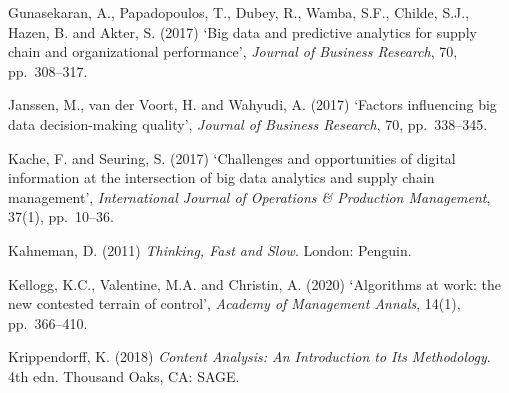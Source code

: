 \documentclass[11pt,a4paper]{article}
\numberwithin{figure}{section}
\numberwithin{table}{section}
\begin{document}
{\noindent\hypertarget{ref31}{}\begin{minipage}[t]{\dimexpr\linewidth-1.05cm\relax}Gunasekaran, A., Papadopoulos, T., Dubey, R., Wamba, S.F., Childe, S.J., Hazen, B. and Akter, S. (2017) `Big data and predictive analytics for supply chain and organizational performance', \emph{Journal of Business Research}, 70, pp.~308--317.\end{minipage}\par\vspace{4pt}
\noindent\hypertarget{ref32}{}\begin{minipage}[t]{\dimexpr\linewidth-1.05cm\relax}Janssen, M., van der Voort, H. and Wahyudi, A. (2017) `Factors influencing big data decision-making quality', \emph{Journal of Business Research}, 70, pp.~338--345.\end{minipage}\par\vspace{4pt}
\noindent\hypertarget{ref33}{}\begin{minipage}[t]{\dimexpr\linewidth-1.05cm\relax}Kache, F. and Seuring, S. (2017) `Challenges and opportunities of digital information at the intersection of big data analytics and supply chain management', \emph{International Journal of Operations \& Production Management}, 37(1), pp.~10--36.\end{minipage}\par\vspace{4pt}
\noindent\hypertarget{ref34}{}\begin{minipage}[t]{\dimexpr\linewidth-1.05cm\relax}Kahneman, D. (2011) \emph{Thinking, Fast and Slow}. London: Penguin.\end{minipage}\par\vspace{4pt}
\noindent\hypertarget{ref35}{}\begin{minipage}[t]{\dimexpr\linewidth-1.05cm\relax}Kellogg, K.C., Valentine, M.A. and Christin, A. (2020) `Algorithms at work: the new contested terrain of control', \emph{Academy of Management Annals}, 14(1), pp.~366--410.\end{minipage}\par\vspace{4pt}
\noindent\hypertarget{ref36}{}\begin{minipage}[t]{\dimexpr\linewidth-1.05cm\relax}Krippendorff, K. (2018) \emph{Content Analysis: An Introduction to Its Methodology}. 4th edn. Thousand Oaks, CA: SAGE.\end{minipage}\par\vspace{4pt}
}
\end{document}
